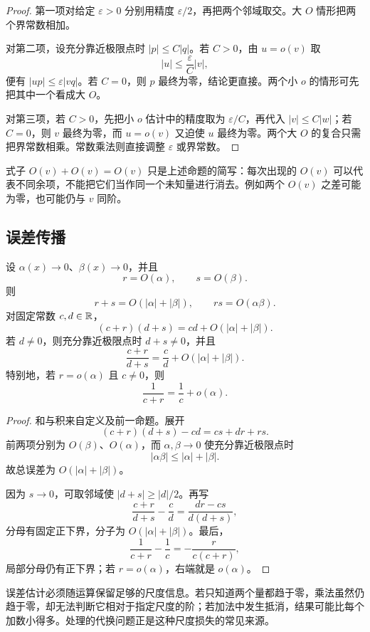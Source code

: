 \begin{proof}
第一项对给定 \(\varepsilon>0\) 分别用精度 \(\varepsilon/2\)，再把两个邻域取交。大 \(O\) 情形把两个界常数相加。

对第二项，设充分靠近极限点时 \(|p|\le C|q|\)。若 \(C>0\)，由 \(u=o(v)\) 取
\[
 |u|\le\frac{\varepsilon}{C}|v|,
\]
便有 \(|up|\le\varepsilon|vq|\)。若 \(C=0\)，则 \(p\) 最终为零，结论更直接。两个小 \(o\) 的情形可先把其中一个看成大 \(O\)。

对第三项，若 \(C>0\)，先把小 \(o\) 估计中的精度取为
\(\varepsilon/C\)，再代入 \(|v|\le C|w|\)；若 \(C=0\)，则
\(v\) 最终为零，而 \(u=o(v)\) 又迫使 \(u\) 最终为零。两个大
\(O\) 的复合只需把界常数相乘。常数乘法则直接调整
\(\varepsilon\) 或界常数。
\end{proof}

式子 \(O(v)+O(v)=O(v)\) 只是上述命题的简写：每次出现的 \(O(v)\) 可以代表不同余项，不能把它们当作同一个未知量进行消去。例如两个 \(O(v)\) 之差可能为零，也可能仍与 \(v\) 同阶。

\subsection{误差传播}

\begin{proposition}[有限次代数运算的误差]
设 \(\alpha(x)\to0\)、\(\beta(x)\to0\)，并且
\[
 r=O(\alpha),\qquad s=O(\beta).
\]
则
\[
 r+s=O(|\alpha|+|\beta|),
 \qquad rs=O(\alpha\beta).
\]
对固定常数 \(c,d\in\mathbb{R}\)，
\[
 (c+r)(d+s)
 =cd+O(|\alpha|+|\beta|).
\]
若 \(d\ne0\)，则充分靠近极限点时 \(d+s\ne0\)，并且
\[
 \frac{c+r}{d+s}
 =\frac cd+O(|\alpha|+|\beta|).
\]
特别地，若 \(r=o(\alpha)\) 且 \(c\ne0\)，则
\[
 \frac1{c+r}=\frac1c+o(\alpha).
\]
\end{proposition}

\begin{proof}
和与积来自定义及前一命题。展开
\[
 (c+r)(d+s)-cd=cs+dr+rs.
\]
前两项分别为 \(O(\beta)\)、\(O(\alpha)\)，而 \(\alpha,\beta\to0\) 使充分靠近极限点时
\[
 |\alpha\beta|\le |\alpha|+|\beta|.
\]
故总误差为 \(O(|\alpha|+|\beta|)\)。

因为 \(s\to0\)，可取邻域使 \(|d+s|\ge|d|/2\)。再写
\[
 \frac{c+r}{d+s}-\frac cd
 =\frac{dr-cs}{d(d+s)},
\]
分母有固定正下界，分子为 \(O(|\alpha|+|\beta|)\)。最后，
\[
 \frac1{c+r}-\frac1c=-\frac{r}{c(c+r)},
\]
局部分母仍有正下界；若 \(r=o(\alpha)\)，右端就是 \(o(\alpha)\)。
\end{proof}

误差估计必须随运算保留足够的尺度信息。若只知道两个量都趋于零，乘法虽然仍趋于零，却无法判断它相对于指定尺度的阶；若加法中发生抵消，结果可能比每个加数小得多。处理的代换问题正是这种尺度损失的常见来源。

